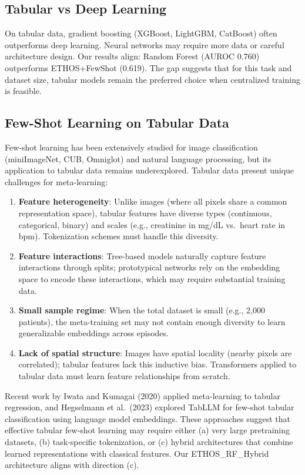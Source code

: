 \subsection{Tabular vs Deep Learning}

On tabular data, gradient boosting (XGBoost, LightGBM, CatBoost) often outperforms deep learning. Neural networks may require more data or careful architecture design. Our results align: Random Forest (AUROC 0.760) outperforms ETHOS+FewShot (0.619). The gap suggests that for this task and dataset size, tabular models remain the preferred choice when centralized training is feasible.

\subsection{Few-Shot Learning on Tabular Data}

Few-shot learning has been extensively studied for image classification (miniImageNet, CUB, Omniglot) and natural language processing, but its application to tabular data remains underexplored. Tabular data present unique challenges for meta-learning:

\begin{enumerate}
\item \textbf{Feature heterogeneity}: Unlike images (where all pixels share a common representation space), tabular features have diverse types (continuous, categorical, binary) and scales (e.g., creatinine in mg/dL vs.\ heart rate in bpm). Tokenization schemes must handle this diversity.
\item \textbf{Feature interactions}: Tree-based models naturally capture feature interactions through splits; prototypical networks rely on the embedding space to encode these interactions, which may require substantial training data.
\item \textbf{Small sample regime}: When the total dataset is small (e.g., 2,000 patients), the meta-training set may not contain enough diversity to learn generalizable embeddings across episodes.
\item \textbf{Lack of spatial structure}: Images have spatial locality (nearby pixels are correlated); tabular features lack this inductive bias. Transformers applied to tabular data must learn feature relationships from scratch.
\end{enumerate}

Recent work by Iwata and Kumagai (2020) applied meta-learning to tabular regression, and Hegselmann et al.\ (2023) explored TabLLM for few-shot tabular classification using language model embeddings. These approaches suggest that effective tabular few-shot learning may require either (a) very large pretraining datasets, (b) task-specific tokenization, or (c) hybrid architectures that combine learned representations with classical features. Our ETHOS\_RF\_Hybrid architecture aligns with direction (c).

